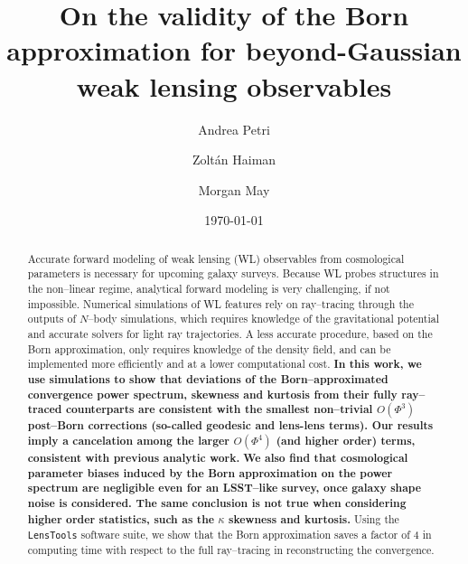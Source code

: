 \documentclass[reprint,aps,prd,superscriptaddress,showkeys,showpacs]{revtex4-1}
\newcommand{\ttt}[1]{\texttt{#1}}
\begin{document}
\title{On the validity of the Born approximation for beyond-Gaussian weak lensing observables}

\author{Andrea Petri}

\author{Zolt\'an Haiman}

\author{Morgan May}

\date{\today}

\label{firstpage}

\begin{abstract}
Accurate forward modeling of weak lensing (WL) observables from cosmological parameters is necessary for upcoming galaxy surveys. Because WL probes structures in the non--linear regime, analytical forward modeling is very challenging, if not impossible. Numerical simulations of WL features rely on ray--tracing through the outputs of $N$--body simulations, which requires knowledge of the gravitational potential and accurate solvers for light ray trajectories. A less accurate procedure, based on the Born approximation, only requires knowledge of the density field, and can be implemented more efficiently and at a lower computational cost. \textbf{\color{red} In this work, we use simulations to show that deviations of the Born--approximated convergence power spectrum, skewness and kurtosis from their fully ray--traced counterparts are consistent with the smallest non--trivial $O(\Phi^3)$ post--Born corrections (so-called geodesic and lens-lens terms). Our results imply a cancelation among the larger $O(\Phi^4)$ (and higher order) terms, consistent with previous analytic work.} \textbf{\color{blue} We also find that cosmological parameter biases induced by the Born approximation on the power spectrum are negligible even for an LSST--like survey, once galaxy shape noise is considered. The same conclusion is not true when considering higher order statistics, such as the $\kappa$ skewness and kurtosis.} Using the \ttt{LensTools} software suite, we show that the Born approximation saves a factor of 4 in computing time with respect to the full ray--tracing in reconstructing the convergence.       
\end{abstract}
\end{document}
